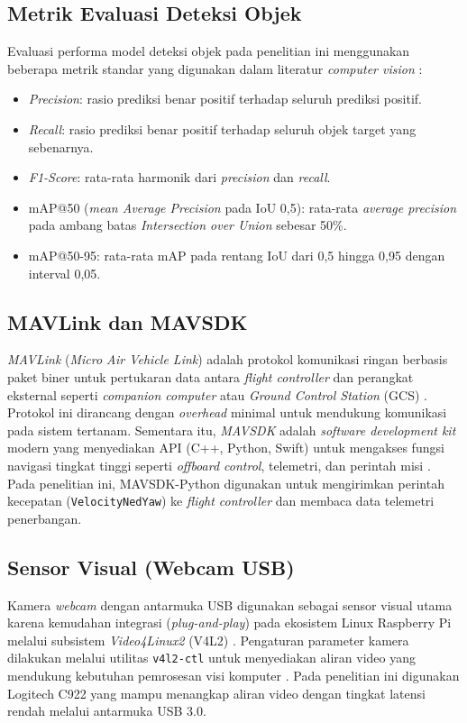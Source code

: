 \subsection{Metrik Evaluasi Deteksi Objek}
Evaluasi performa model deteksi objek pada penelitian ini menggunakan beberapa metrik standar yang digunakan dalam literatur \textit{computer vision} \cite{Padilla2021mAPSurvey}:
\begin{itemize}
	\item \textit{Precision}: rasio prediksi benar positif terhadap seluruh prediksi positif.
	\item \textit{Recall}: rasio prediksi benar positif terhadap seluruh objek target yang sebenarnya.
	\item \textit{F1-Score}: rata-rata harmonik dari \textit{precision} dan \textit{recall}.
	\item mAP@50 (\textit{mean Average Precision} pada IoU 0,5): rata-rata \textit{average precision} pada ambang batas \textit{Intersection over Union} sebesar 50\%.
	\item mAP@50-95: rata-rata mAP pada rentang IoU dari 0,5 hingga 0,95 dengan interval 0,05.
\end{itemize}

\subsection{MAVLink dan MAVSDK}
\textit{MAVLink} (\textit{Micro Air Vehicle Link}) adalah protokol komunikasi ringan berbasis paket biner untuk pertukaran data antara \textit{flight controller} dan perangkat eksternal seperti \textit{companion computer} atau \textit{Ground Control Station} (GCS) \cite{MAVLink2024}. Protokol ini dirancang dengan \textit{overhead} minimal untuk mendukung komunikasi pada sistem tertanam. Sementara itu, \textit{MAVSDK} adalah \textit{software development kit} modern yang menyediakan API (C++, Python, Swift) untuk mengakses fungsi navigasi tingkat tinggi seperti \textit{offboard control}, telemetri, dan perintah misi \cite{mavsdk_doc2025}. Pada penelitian ini, MAVSDK-Python digunakan untuk mengirimkan perintah kecepatan (\texttt{VelocityNedYaw}) ke \textit{flight controller} dan membaca data telemetri penerbangan.

\subsection{Sensor Visual (Webcam USB)}
Kamera \textit{webcam} dengan antarmuka USB digunakan sebagai sensor visual utama karena kemudahan integrasi (\textit{plug-and-play}) pada ekosistem Linux Raspberry Pi melalui subsistem \textit{Video4Linux2} (V4L2) \cite{V4L2_2024}. Pengaturan parameter kamera dilakukan melalui utilitas \texttt{v4l2-ctl} untuk menyediakan aliran video yang mendukung kebutuhan pemrosesan visi komputer \cite{Bradski2000OpenCV}. Pada penelitian ini digunakan Logitech C922 yang mampu menangkap aliran video dengan tingkat latensi rendah melalui antarmuka USB 3.0.

